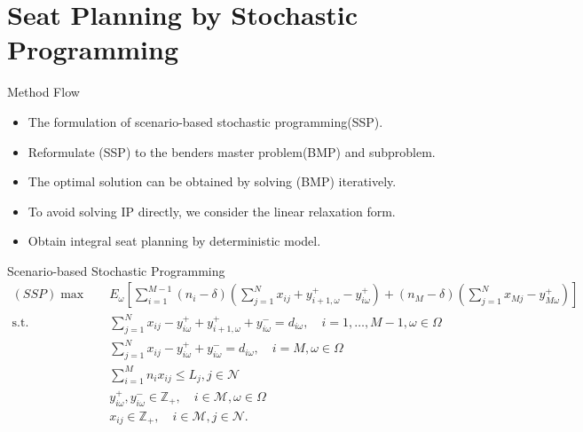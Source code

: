 
\section{Seat Planning by Stochastic Programming}
    \frame{\sectionpage}

    \begin{frame}{Method Flow}
      \begin{itemize}
        \item The formulation of scenario-based stochastic programming(SSP).
        \item Reformulate (SSP) to the benders master problem(BMP) and subproblem.
        \item The optimal solution can be obtained by solving (BMP) iteratively.
        \item To avoid solving IP directly, we consider the linear relaxation form.
        \item Obtain integral seat planning by deterministic model.
      \end{itemize}
    \end{frame}

    \begin{frame}{Scenario-based Stochastic Programming}
      \footnotesize
      \begin{equation}\label{sto_form}
        \begin{aligned}
       (SSP) \max \quad & E_{\omega}\left[\sum_{i=1}^{M-1} (n_i-\delta) (\sum_{j= 1}^{N} x_{ij} + y_{i+1,\omega}^{+} - y_{i \omega}^{+}) + (n_{M}-\delta) (\sum_{j= 1}^{N} x_{Mj} - y_{M \omega}^{+})\right] \\
        \text {s.t.} \quad & \sum_{j= 1}^{N} x_{ij}-y_{i \omega}^{+}+
        y_{i+1, \omega}^{+} + y_{i \omega}^{-}=d_{i \omega}, \quad i = 1,\ldots,M-1, \omega \in \Omega \\
        & \sum_{j= 1}^{N} x_{ij} -y_{i \omega}^{+}+y_{i \omega}^{-}=d_{i \omega}, \quad i = M, \omega \in \Omega \\
        & \sum_{i=1}^{M} n_{i} x_{ij} \leq L_j, j \in \mathcal{N}\\
        & y_{i \omega}^{+}, y_{i \omega}^{-} \in \mathbb{Z}_{+}, \quad i \in \mathcal{M}, \omega \in \Omega \\
        & x_{ij} \in \mathbb{Z}_{+}, \quad i \in \mathcal{M}, j \in \mathcal{N}.
        \end{aligned}
      \end{equation}
    \end{frame}

